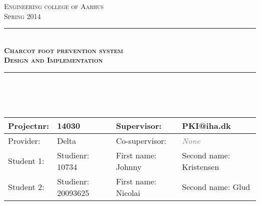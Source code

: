 \newcommand{\HRule}{\rule{\linewidth}{0.5mm}} %

\begin{center} %
 

\textsc{\LARGE Engineering college of Aarhus}\\[1.5cm] %
\textsc{\large Spring 2014}\\[0.5cm] %


\HRule \\[0.4cm]
{ \Large \bfseries \textsc{Charcot foot prevention system}}\\[0.4cm] %
{ \huge \bfseries \textsc{Design and Implementation}} %
\HRule \\[1.5cm]
\ \\
\ \\
\vfill
\begin{table}[H]
\centering
    \begin{tabular}{|l|l|l|p{4cm}|}
    \hline
    Projectnr:   & 14030                                                       & Supervisor:             & PKI@iha.dk              \\ \hline
    Provider:    & Delta                                                       & Co-supervisor:          & \textcolor{gray}{\textit{None}}           \\ \hline
    Student  1:  & Studienr: 10734                                             & First name: Johnny      & Second name: Kristensen \\ \hline
    Student  2:  & Studienr: 20093625                                          & First name: Nicolai     & Second name: Glud       \\ \hline
    \end{tabular}


\end{table}
\end{center}
